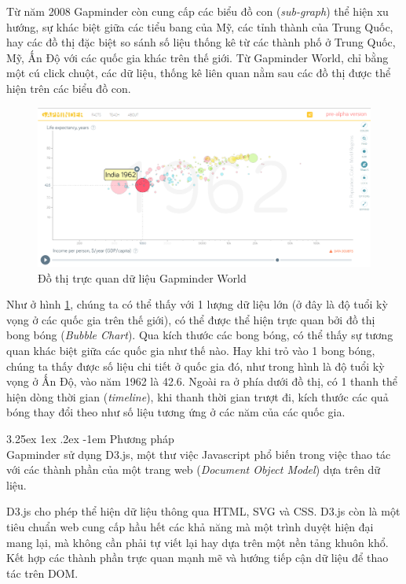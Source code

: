 \documentclass[12pt,a4paper]{article}
\makeatletter
\newcommand{\myparagraph}[1]{\paragraph{#1}\mbox{}\\} %
\renewcommand\paragraph{\@startsection{paragraph}{5}{\z@}%
  {3.25ex \@plus1ex \@minus.2ex}%
  {-1em}%
  {\normalfont\normalsize\bfseries}}
\makeatother
\begin{document}
Từ năm 2008 Gapminder còn cung cấp các biểu đồ con (\textit{sub-graph})\cite{subgraph} thể hiện xu hướng, sự khác biệt giữa các tiểu bang của Mỹ, các tỉnh thành của Trung Quốc, hay các đồ thị đặc biệt so sánh số liệu thống kê từ các thành phố ở Trung Quốc, Mỹ, Ấn Độ với các quốc gia khác trên thế giới. Từ Gapminder World, chỉ bằng một cú click chuột, các dữ liệu, thống kê liên quan nằm sau các đồ thị được thể hiện trên các biểu đồ con.

\begin{figure}[!h]
	\begin{center}
    \includegraphics[scale=.4]{image/gapminder}
    \caption{Đồ thị trực quan dữ liệu Gapminder World}
    \label{fig:gapminder}
	\end{center}
\end{figure}

Như ở hình \ref{fig:gapminder}, chúng ta có thể thấy với 1 lượng dữ liệu lớn (ở đây là độ tuổi kỳ vọng ở các quốc gia trên thế giới), có thể được thể hiện trực quan bởi đồ thị bong bóng (\textit{Bubble Chart}). Qua kích thước các bong bóng, có thể thấy sự tương quan khác biệt giữa các quốc gia như thế nào. Hay khi trỏ vào 1 bong bóng, chúng ta thấy được số liệu chi tiết ở quốc gia đó, như trong hình là độ tuổi kỳ vọng ở Ấn Độ, vào năm 1962 là 42.6. Ngoài ra ở phía dưới đồ thị, có 1 thanh thể hiện dòng thời gian (\textit{timeline}), khi thanh thời gian trượt đi, kích thước các quả bóng thay đổi theo như số liệu tương ứng ở các năm của các quốc gia.

\myparagraph{Phương pháp}
Gapminder sử dụng D3.js, một thư việc Javascript phổ biến trong việc thao tác với các thành phần của một trang web (\textit{Document Object Model}) dựa trên dữ liệu. 

D3.js cho phép thể hiện dữ liệu thông qua HTML, SVG và CSS. D3.js còn là một tiêu chuẩn web cung cấp hầu hết các khả năng mà một trình duyệt hiện đại mang lại, mà không cần phải tự viết lại hay dựa trên một nền tảng khuôn khổ. Kết hợp các thành phần trực quan mạnh mẽ và hướng tiếp cận dữ liệu để thao tác trên DOM.
\end{document}
